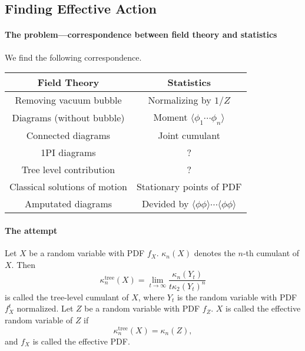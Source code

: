 \documentclass{article}
\begin{document}
\subsection{Finding Effective Action}

\label{ssec:finding_gamma}

\paragraph*{The problem---correspondence between field theory and statistics}
We find the following correspondence.
\begin{longtable}{cc}
    Field Theory & Statistics \\
    \midrule
    Removing vacuum bubble & Normalizing by $1/Z$ \\
    Diagrams (without bubble) & Moment $\langle \phi_1\cdots \phi_n\rangle $ \\ Connected diagrams & Joint cumulant \\
    1PI diagrams & ? \\
    Tree level contribution & ? \\
    Classical solutions of motion & Stationary points of PDF \\
    Amputated diagrams & Devided by $\langle \phi\phi \rangle \cdots \langle \phi\phi \rangle$ \\
\end{longtable}

\paragraph*{The attempt}
Let $X$ be a random variable with PDF $f_X$.
$\kappa_n(X)$ denotes the $n$-th cumulant of $X$.
Then
\[ \kappa^{\text{tree}}_n(X) = \lim_{t\rightarrow\infty} \frac{\kappa_n(Y_t)}{t \kappa_2(Y_t)^n} \]
is called the tree-level cumulant of $X$, where $Y_t$ is the random variable with PDF $f_X^t$ normalized.
Let $Z$ be a random variable with PDF $f_Z$.
$X$ is called the effective random variable of $Z$ if
\[ \kappa_n^{\text{tree}}(X) = \kappa_n(Z), \]
and $f_X$ is called the effective PDF.
\end{document}
